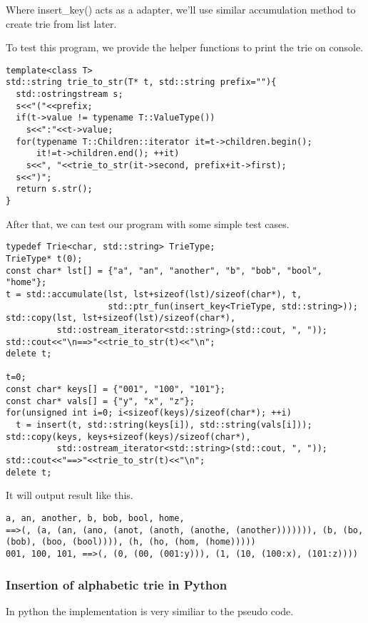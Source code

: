 \documentclass{article}
\begin{document}
Where insert\_key() acts as a adapter, we'll use similar accumulation
method to create trie from list later.

To test this program, we provide the helper functions to print the
trie on console. 

\begin{lstlisting}
template<class T>
std::string trie_to_str(T* t, std::string prefix=""){
  std::ostringstream s;
  s<<"("<<prefix;
  if(t->value != typename T::ValueType())
    s<<":"<<t->value;
  for(typename T::Children::iterator it=t->children.begin();
      it!=t->children.end(); ++it)
    s<<", "<<trie_to_str(it->second, prefix+it->first);
  s<<")";
  return s.str();
}
\end{lstlisting}

After that, we can test our program with some simple test cases.

\begin{lstlisting}
typedef Trie<char, std::string> TrieType;
TrieType* t(0);
const char* lst[] = {"a", "an", "another", "b", "bob", "bool", "home"};
t = std::accumulate(lst, lst+sizeof(lst)/sizeof(char*), t,
                    std::ptr_fun(insert_key<TrieType, std::string>));
std::copy(lst, lst+sizeof(lst)/sizeof(char*),
          std::ostream_iterator<std::string>(std::cout, ", "));
std::cout<<"\n==>"<<trie_to_str(t)<<"\n";
delete t;

t=0;
const char* keys[] = {"001", "100", "101"};
const char* vals[] = {"y", "x", "z"};
for(unsigned int i=0; i<sizeof(keys)/sizeof(char*); ++i)
  t = insert(t, std::string(keys[i]), std::string(vals[i]));
std::copy(keys, keys+sizeof(keys)/sizeof(char*),
          std::ostream_iterator<std::string>(std::cout, ", "));
std::cout<<"==>"<<trie_to_str(t)<<"\n";
delete t;
\end{lstlisting}

It will output result like this.

\begin{verbatim}
a, an, another, b, bob, bool, home, 
==>(, (a, (an, (ano, (anot, (anoth, (anothe, (another))))))), (b, (bo,
(bob), (boo, (bool)))), (h, (ho, (hom, (home)))))
001, 100, 101, ==>(, (0, (00, (001:y))), (1, (10, (100:x), (101:z))))
\end{verbatim}

\subsubsection*{Insertion of alphabetic trie in Python}
In python the implementation is very similiar to the pseudo code.
\end{document}
